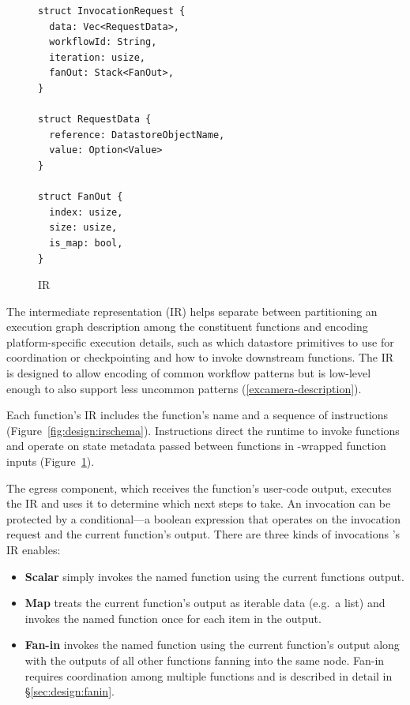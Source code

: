 \begin{figure}[t!]
    \centering
    \begin{verbatim}
struct InvocationRequest {
  data: Vec<RequestData>,
  workflowId: String,
  iteration: usize,
  fanOut: Stack<FanOut>,
}

struct RequestData {
  reference: DatastoreObjectName,
  value: Option<Value>
}

struct FanOut {
  index: usize,
  size: usize,
  is_map: bool,
}
    \end{verbatim}
    \caption{\name{} IR}
    \label{fig:design:unum-request}
\end{figure}

The \name{} intermediate representation (IR) helps separate between partitioning
an execution graph description among the constituent functions and encoding
platform-specific execution details, such as which datastore primitives to
use for coordination or checkpointing and how to invoke downstream functions.
The IR is designed to allow encoding of common workflow patterns but is
low-level enough to also support less uncommon patterns
(\ref{excamera-description}).

Each function's IR includes the function's name and a sequence of instructions
(Figure~\ref{fig:design:irschema}). Instructions direct the runtime to invoke
functions and operate on state metadata passed between functions in
\name{}-wrapped function inputs (Figure~\ref{fig:design:unum-request}).

The egress component, which receives the function's user-code output, executes
the IR and uses it to determine which next steps to take. An invocation can be
protected by a conditional---a boolean expression that operates on the
invocation request and the current function's output. There are three kinds of
invocations \name{}'s IR enables:

\begin{itemize}
  \item \textbf{Scalar} simply invokes the named function using the
        current functions output.
  \item \textbf{Map} treats the current function's output as iterable data
        (e.g.\ a list) and invokes the named function once for each item in the
        output.
  \item \textbf{Fan-in} invokes the named function using the current function's
        output along with the outputs of all other functions fanning into the
        same node. Fan-in requires coordination among multiple functions and is
        described in detail in \S\ref{sec:design:fanin}.
\end{itemize}

